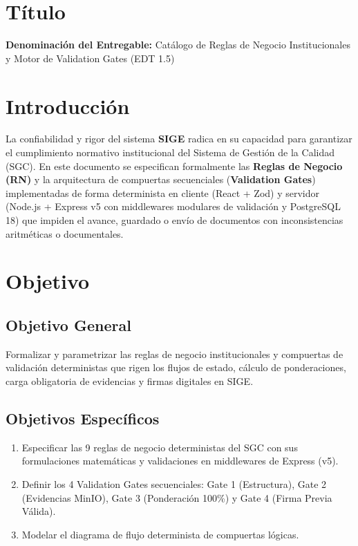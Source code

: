\documentclass[12pt,a4paper]{article}
\begin{document}

\vspace{0.25cm}
\section{Título}
\textbf{Denominación del Entregable:} Catálogo de Reglas de Negocio Institucionales y Motor de Validation Gates (EDT 1.5)



\section{Introducción}
La confiabilidad y rigor del sistema \textbf{SIGE} radica en su capacidad para garantizar el cumplimiento normativo institucional del Sistema de Gestión de la Calidad (SGC). En este documento se especifican formalmente las \textbf{Reglas de Negocio (RN)} y la arquitectura de compuertas secuenciales (\textbf{Validation Gates}) implementadas de forma determinista en cliente (React + Zod) y servidor (Node.js + Express v5 con middlewares modulares de validación y PostgreSQL 18) que impiden el avance, guardado o envío de documentos con inconsistencias aritméticas o documentales.

\section{Objetivo}

\subsection{Objetivo General}
Formalizar y parametrizar las reglas de negocio institucionales y compuertas de validación deterministas que rigen los flujos de estado, cálculo de ponderaciones, carga obligatoria de evidencias y firmas digitales en SIGE.

\subsection{Objetivos Específicos}
\begin{enumerate}[leftmargin=1.5em, itemsep=2pt, topsep=2pt]
    \item Especificar las 9 reglas de negocio deterministas del SGC con sus formulaciones matemáticas y validaciones en middlewares de Express (v5).
    \item Definir los 4 Validation Gates secuenciales: Gate 1 (Estructura), Gate 2 (Evidencias MinIO), Gate 3 (Ponderación 100\%) y Gate 4 (Firma Previa Válida).
    \item Modelar el diagrama de flujo determinista de compuertas lógicas.
\end{enumerate}
\end{document}
